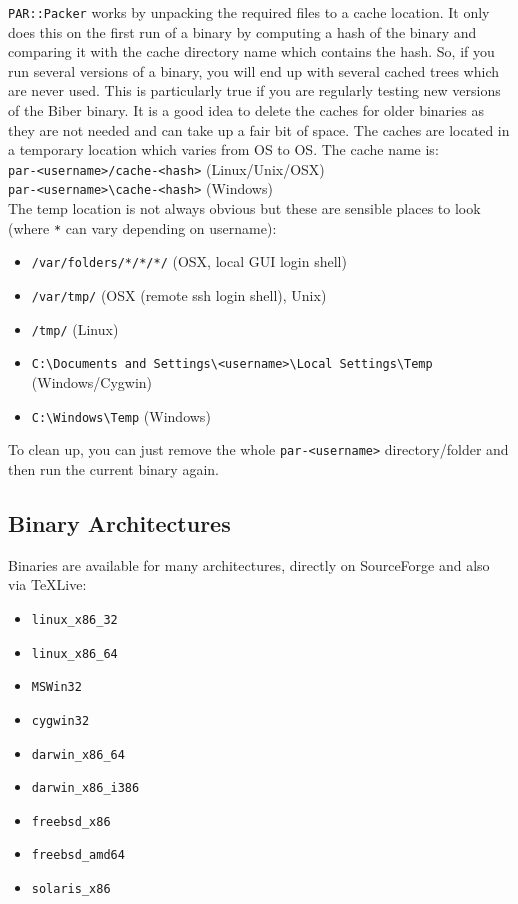 \documentclass{ltxdockit}
\begin{document}
\verb+PAR::Packer+ works by unpacking the required files to a cache
location. It only does this on the first run of a binary 
by computing a hash of the binary and comparing it with
the cache directory name which contains the hash. So, if you run
several versions of a binary, you will end up with several cached
trees which are never used. This is particularly true if you are regularly
testing new versions of the Biber binary. It is a good idea to
delete the caches for older binaries as they are not needed and can take up
a fair bit of space. The caches are located in a temporary location which
varies from OS to OS. The cache name is:\\[1ex]

\noindent\verb+par-<username>/cache-<hash>+ (Linux/Unix/OSX)\\
\verb+par-<username>\cache-<hash>+ (Windows)\\[1ex]

\noindent The temp location is not always obvious but these are sensible
places to look (where \verb+*+ can vary depending on username):

\begin{itemize}
\item \verb+/var/folders/*/*/*/+ (OSX, local GUI login shell)
\item \verb+/var/tmp/+ (OSX (remote ssh login shell), Unix)
\item \verb+/tmp/+ (Linux)
\item \verb+C:\Documents and Settings\<username>\Local Settings\Temp+ (Windows/Cygwin)
\item \verb+C:\Windows\Temp+ (Windows)
\end{itemize}

\noindent To clean up, you can just remove the whole \verb+par-<username>+
directory/folder and then run the current binary again.

\subsection{Binary Architectures}

Binaries are available for many architectures, directly on SourceForge and
also via \TeX Live:

\begin{itemize}
\item \verb+linux_x86_32+
\item \verb+linux_x86_64+
\item \verb+MSWin32+
\item \verb+cygwin32+
\item \verb+darwin_x86_64+
\item \verb+darwin_x86_i386+
\item \verb+freebsd_x86+\tpb
\item \verb+freebsd_amd64+\tpb
\item \verb+solaris_x86+\tpb
\end{itemize}
\end{document}
